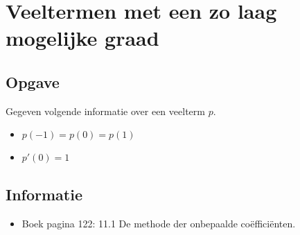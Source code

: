 \documentclass[examenvragen.tex]{subfiles}
\begin{document}
\section{Veeltermen met een zo laag mogelijke graad}
\subsection{Opgave}
Gegeven volgende informatie over een veelterm $p$.
\begin{multicols}{2}
\begin{itemize}
\item $p(-1) = p(0) = p(1)$
\item $p'(0) = 1$
\end{itemize}
\end{multicols}
\subsection{Informatie}
\begin{itemize}
\item Boek pagina 122: 11.1 De methode der onbepaalde co\"effici\"enten.
\end{itemize}
\end{document}
